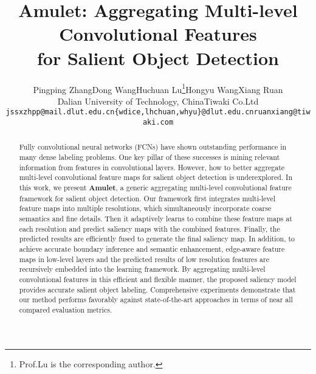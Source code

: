 \documentclass[10pt,twocolumn,letterpaper]{article}
\begin{document}
\title{Amulet: Aggregating Multi-level Convolutional Features \\ for Salient Object Detection}

\author{Pingping Zhang\quad Dong Wang\quad Huchuan Lu\thanks{Prof.Lu is the corresponding author.}\quad Hongyu Wang\quad Xiang Ruan\\
Dalian University of Technology, China\quad\quad Tiwaki Co.Ltd\\
{\tt\small jssxzhpp@mail.dlut.edu.cn\quad \{wdice,lhchuan,whyu\}@dlut.edu.cn\quad ruanxiang@tiwaki.com}
}

\maketitle
\thispagestyle{empty}

\begin{abstract}
Fully convolutional neural networks (FCNs) have shown outstanding performance in many dense
labeling problems.
One key pillar of these successes is mining relevant information from features in convolutional layers.
However, how to better aggregate multi-level convolutional feature maps for salient object detection is underexplored.
In this work, we present \textbf{Amulet}, a generic aggregating multi-level convolutional feature framework for salient object detection.
Our framework first integrates multi-level feature maps into multiple resolutions, which simultaneously incorporate coarse semantics and fine details.
Then it adaptively learns to combine these feature maps at each resolution and predict saliency maps with the combined features. Finally, the predicted results are efficiently fused to generate the final saliency map.
In addition, to achieve accurate boundary inference and semantic enhancement, edge-aware feature maps in low-level layers and the predicted results of low resolution features are recursively embedded into the learning framework.
By aggregating multi-level convolutional features in this efficient and flexible manner, the proposed saliency model provides accurate salient object labeling.
Comprehensive experiments demonstrate that our method performs favorably against state-of-the-art approaches in terms of near all compared evaluation metrics.
\end{abstract}
\end{document}
